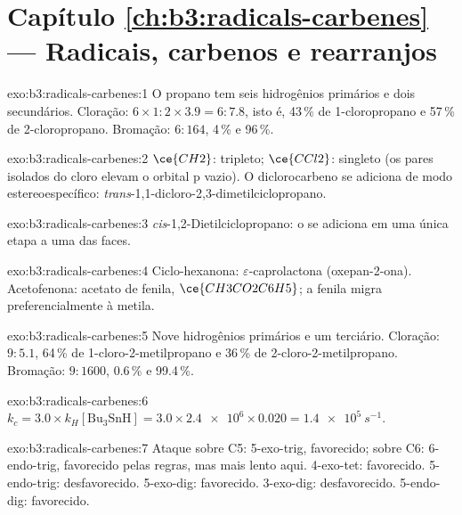 \section*{Capítulo \ref{ch:b3:radicals-carbenes} --- Radicais, carbenos e rearranjos}

\begin{solution}{exo:b3:radicals-carbenes:1}
O propano tem seis hidrogênios primários e dois secundários. Cloração: $6 \times 1 : 2 \times 3.9 = 6 : 7.8$,
isto é, 43\,\% de 1-cloropropano e 57\,\% de 2-cloropropano. Bromação: $6 : 164$, 4\,\% e
96\,\%.
\end{solution}

\begin{solution}{exo:b3:radicals-carbenes:2}
$\ce{CH2}$: tripleto; $\ce{CCl2}$: singleto (os pares isolados do cloro elevam o orbital p vazio).
O diclorocarbeno se adiciona de modo estereoespecífico: \textit{trans}-1,1-dicloro-2,3-dimetilciclopropano.
\end{solution}

\begin{solution}{exo:b3:radicals-carbenes:3}
\textit{cis}-1,2-Dietilciclopropano: o  se adiciona em uma única etapa a uma das faces.
\end{solution}

\begin{solution}{exo:b3:radicals-carbenes:4}
Ciclo-hexanona: $\varepsilon$-caprolactona (oxepan-2-ona). Acetofenona: acetato de fenila,
$\ce{CH3CO2C6H5}$; a fenila migra preferencialmente à metila.
\end{solution}

\begin{solution}{exo:b3:radicals-carbenes:5}
Nove hidrogênios primários e um terciário. Cloração: $9 : 5.1$, 64\,\% de 1-cloro-2-metilpropano
e 36\,\% de 2-cloro-2-metilpropano. Bromação: $9 : 1600$, 0.6\,\% e 99.4\,\%.
\end{solution}

\begin{solution}{exo:b3:radicals-carbenes:6}
$k_c = 3.0 \times k_H[\mathrm{Bu_3SnH}] = 3.0 \times \num{2.4e6} \times 0.020 = \qty{1.4e5}{s^{-1}}$.
\end{solution}

\begin{solution}{exo:b3:radicals-carbenes:7}
Ataque sobre C5: 5-exo-trig, favorecido; sobre C6: 6-endo-trig, favorecido pelas regras, mas
mais lento aqui. 4-exo-tet: favorecido. 5-endo-trig: desfavorecido. 5-exo-dig: favorecido.
3-exo-dig: desfavorecido. 5-endo-dig: favorecido.
\end{solution}

